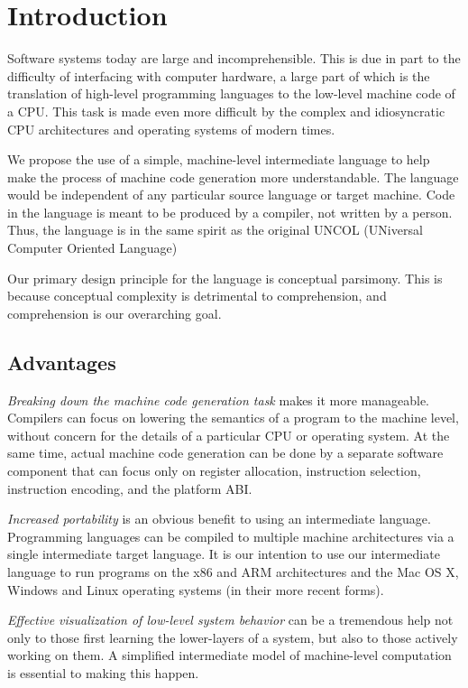 \section{Introduction}

Software systems today are large and incomprehensible.
This is due in part to the difficulty
of interfacing with computer hardware,
a large part of which is the translation
of high-level programming languages to the
low-level machine code of a CPU. This task is
made even more difficult by the complex and idiosyncratic
CPU architectures and operating systems of modern times.

We propose the use of a simple, machine-level
intermediate language to help make
the process of machine code generation
more understandable.
The language would be independent of any particular
source language or target machine.
Code in the language is meant to be
produced by a compiler, not written by a person.
Thus, the language is in the same
spirit as the original UNCOL (UNiversal
Computer Oriented Language)~\cite{strong1958problem}

Our primary design principle for the language
is conceptual parsimony. This is because conceptual
complexity is detrimental to comprehension, and
comprehension is our overarching goal.

\subsection{Advantages}

\emph{Breaking down the machine code generation task} makes
it more manageable. Compilers can focus on lowering
the semantics of a program to the machine level,
without concern for the details of a particular CPU or operating system.
At the same time, actual machine code generation can be done
by a separate software component that can focus only on
register allocation, instruction selection, instruction
encoding, and the platform ABI.

\emph{Increased portability} is an obvious benefit to using an intermediate language.
Programming languages can be compiled to multiple machine architectures
via a single intermediate target language.
It is our intention to use our intermediate language
to run programs on the x86 and ARM architectures and
the Mac OS X, Windows and Linux operating systems (in their more recent forms).

\emph{Effective visualization of low-level system behavior} can be a tremendous help
not only to those first learning the lower-layers of a system, but
also to those actively working on them.
A simplified intermediate model of machine-level computation is
essential to making this happen.

